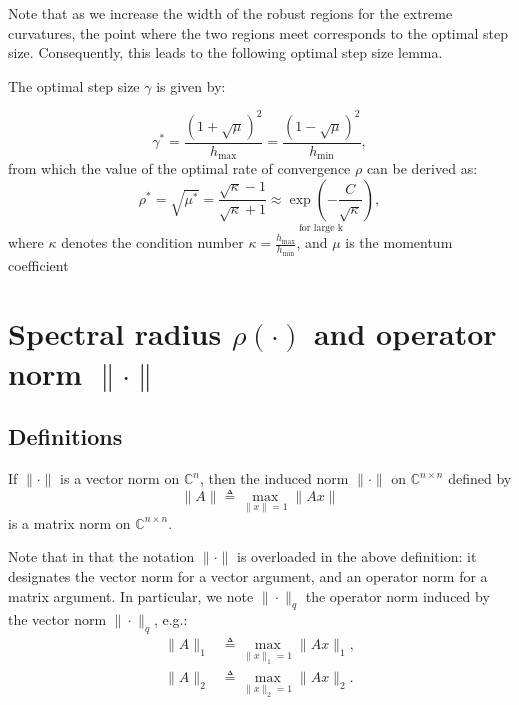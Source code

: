 \documentclass{article}
\begin{document}
Note that as we increase the width of the robust regions for the extreme curvatures, the point where the two regions meet corresponds to the optimal step size. Consequently, this leads to the following optimal step size lemma.

\begin{lemma}
The optimal step size $\gamma$ is given by:
  
\begin{equation}
\gamma^* = \frac{(1 + \sqrt{\mu})^2}{h_{\max}} = \frac{(1 - \sqrt{\mu})^2}{h_{\min}},
\end{equation}
from which the value of the optimal rate of convergence $\rho$ can be derived as:
\begin{equation}
\rho^* = \sqrt{\mu^*} = \frac{\sqrt{\kappa} - 1}{\sqrt{\kappa} + 1} \underset{\text{for\ large\ k}}{\approx \exp(-\frac{C}{\sqrt{\kappa}})},
\end{equation}
where $\kappa$ denotes the condition number $\kappa=\frac{h_{\max}}{h_{\min}}$, and $\mu$ is the momentum coefficient
\end{lemma}

\pagebreak

\appendix
%
\section{Spectral radius $\rho(\cdot)$ and operator norm $\| \cdot \|$}
\label{sec:matrix_norm_and_spectral_radius}
\subsection*{Definitions}
\begin{defn}
If $\| \cdot \|$ is a vector norm on $\mathds{C}^n$, then the induced norm $\| \cdot \|$ on $\mathds{C}^{n\times n}$ defined by
\[
	\|A\| \triangleq \max_{\|x\|=1}\|Ax\|
\]
is a matrix norm on $\mathds{C}^{n\times n}$. 
\end{defn} 
\par Note that in that the notation $\| \cdot \|$ is overloaded in the above definition: it designates the vector norm for a vector argument, and an operator norm for a matrix argument. In particular, we note $\| \cdot \|_q$ the operator norm induced by the vector norm $\| \cdot \|_q$, e.g.:
\begin{align}
	\|A\|_1 &\triangleq \max_{\|x\|_1=1}\|Ax\|_1, \nonumber \\
	\|A\|_2 &\triangleq \max_{\|x\|_2=1}\|Ax\|_2. \nonumber
\end{align}
\end{document}
